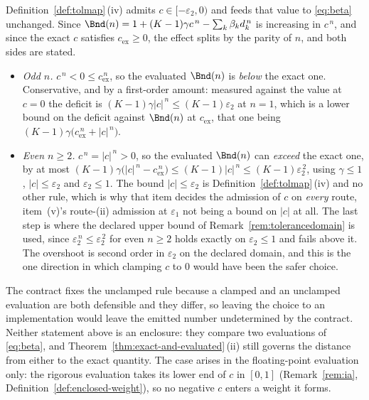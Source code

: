 
\begin{remark}
\label{rem:cdirection}
Definition~\ref{def:tolmap}\,(iv) admits $c\in[-\varepsilon_2,0)$ and feeds
that value to \eqref{eq:beta} unchanged. Since
$\Bnd(n)=1+(K-1)\gamma c^{\,n}-\sum_k\beta_kd_k^{\,n}$ is increasing in
$c^{\,n}$, and since the exact $c$ satisfies $c_{\mathrm{ex}}\ge0$, the effect
splits by the parity of $n$, and both sides are stated.
\begin{itemize}[leftmargin=1.6em]
\item \emph{Odd $n$.} $c^{\,n}<0\le c_{\mathrm{ex}}^{\,n}$, so the evaluated
  $\Bnd(n)$ is \emph{below} the exact one. Conservative, and by a first-order
  amount: measured against the value at $c=0$ the deficit is
  $(K-1)\gamma|c|^{\,n}\le(K-1)\varepsilon_2$ at $n=1$, which is a lower bound
  on the deficit against $\Bnd(n)$ at $c_{\mathrm{ex}}$, that one being
  $(K-1)\gamma\big(c_{\mathrm{ex}}^{\,n}+|c|^{\,n}\big)$.
\item \emph{Even $n\ge2$.} $c^{\,n}=|c|^{\,n}>0$, so the evaluated $\Bnd(n)$
  can \emph{exceed} the exact one, by at most
  $(K-1)\gamma\big(|c|^{\,n}-c_{\mathrm{ex}}^{\,n}\big)
  \le(K-1)|c|^{\,n}\le(K-1)\varepsilon_2^{\,2}$, using $\gamma\le1$,
  $|c|\le\varepsilon_2$ and $\varepsilon_2\le1$. The bound
  $|c|\le\varepsilon_2$ is Definition~\ref{def:tolmap}\,(iv) and no other rule,
  which is why that item decides the admission of $c$ on \emph{every} route,
  item~(v)'s route-(ii) admission at $\varepsilon_1$ not being a bound on $|c|$
  at all. The last step is where the declared upper bound of
  Remark~\ref{rem:tolerancedomain} is used, since
  $\varepsilon_2^{\,n}\le\varepsilon_2^{\,2}$ for even $n\ge2$ holds exactly on
  $\varepsilon_2\le1$ and fails above it. The overshoot is second order in
  $\varepsilon_2$ on the declared domain, and this is the one direction in
  which clamping $c$ to $0$ would have been the safer choice.
\end{itemize}
The contract fixes the unclamped rule because a clamped and an unclamped
evaluation are both defensible and they differ, so leaving the choice to an
implementation would leave the emitted number undetermined by the contract.
Neither statement above is an enclosure: they compare two evaluations of
\eqref{eq:beta}, and Theorem~\ref{thm:exact-and-evaluated}\,(ii) still governs the distance
from either to the exact quantity. The case arises in the floating-point
evaluation only: the rigorous evaluation takes its lower end of $c$ in
$[0,1]$ (Remark~\ref{rem:ia}, Definition~\ref{def:enclosed-weight}), so no
negative $c$ enters a weight it forms.
\end{remark}
